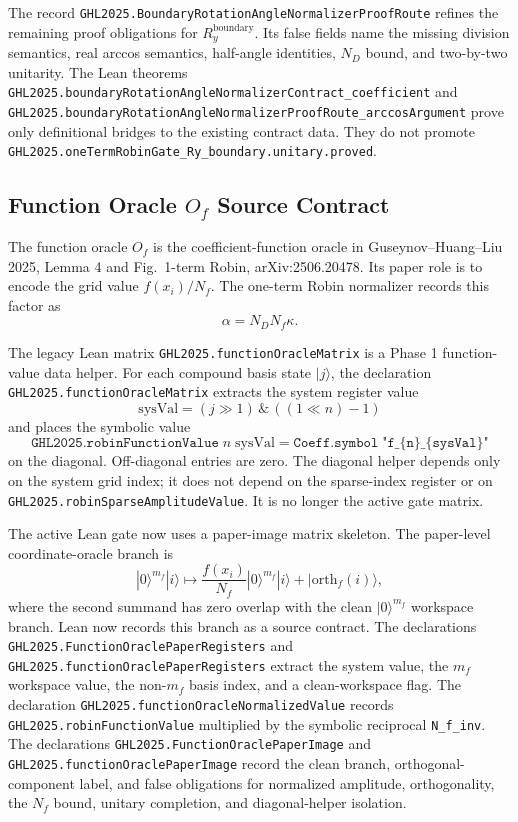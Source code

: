 The record \texttt{GHL2025.BoundaryRotationAngleNormalizerProofRoute} refines
the remaining proof obligations for \(R_y^{\mathrm{boundary}}\).  Its false
fields name the missing division semantics, real arccos semantics, half-angle
identities, \(N_D\) bound, and two-by-two unitarity.  The Lean theorems
\texttt{GHL2025.boundaryRotationAngleNormalizerContract\_coefficient} and
\texttt{GHL2025.boundaryRotationAngleNormalizerProofRoute\_arccosArgument}
prove only definitional bridges to the existing contract data.  They do not
promote \texttt{GHL2025.oneTermRobinGate\_Ry\_boundary.unitary.proved}.

\subsection{Function Oracle $O_f$ Source Contract}

The function oracle $O_f$ is the coefficient-function oracle in
Guseynov--Huang--Liu 2025, Lemma 4 and Fig.~1-term Robin,
arXiv:2506.20478.  Its paper role is to encode the grid value
\(f(x_i)/N_f\).  The one-term Robin normalizer records this factor as
\[
  \alpha = N_D N_f \kappa .
\]

The legacy Lean matrix \texttt{GHL2025.functionOracleMatrix} is a Phase 1
function-value data helper.  For each
compound basis state \(|j\rangle\), the declaration
\texttt{GHL2025.functionOracleMatrix} extracts the system register value
\[
  \text{sysVal} = (j \gg 1) \,\&\, ((1 \ll n) - 1)
\]
and places the symbolic value
\[
  \texttt{GHL2025.robinFunctionValue}\;n\;\text{sysVal}
  =
  \texttt{Coeff.symbol}\;\texttt{"f\_\{n\}\_\{sysVal\}"}
\]
on the diagonal.  Off-diagonal entries are zero.  The diagonal helper depends
only on the system grid index; it does not depend on the sparse-index register
or on \texttt{GHL2025.robinSparseAmplitudeValue}.  It is no longer the active
gate matrix.

The active Lean gate now uses a paper-image matrix skeleton.  The paper-level
coordinate-oracle branch is
\[
  |0\rangle^{m_f}|i\rangle
  \longmapsto
  \frac{f(x_i)}{N_f}|0\rangle^{m_f}|i\rangle
  + |\mathrm{orth}_f(i)\rangle,
\]
where the second summand has zero overlap with the clean
\(|0\rangle^{m_f}\) workspace branch.  Lean now records this branch as a
source contract.  The declarations
\texttt{GHL2025.FunctionOraclePaperRegisters} and
\texttt{GHL2025.functionOraclePaperRegisters} extract the system value, the
\(m_f\) workspace value, the non-\(m_f\) basis index, and a clean-workspace
flag.  The declaration \texttt{GHL2025.functionOracleNormalizedValue} records
\texttt{GHL2025.robinFunctionValue} multiplied by the symbolic reciprocal
\texttt{N\_f\_inv}.  The declarations
\texttt{GHL2025.FunctionOraclePaperImage} and
\texttt{GHL2025.functionOraclePaperImage} record the clean branch,
orthogonal-component label, and false obligations for normalized amplitude,
orthogonality, the \(N_f\) bound, unitary completion, and diagonal-helper
isolation.

